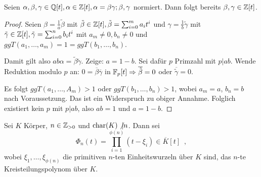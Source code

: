 \documentclass[12pt,a4paper]{scrartcl}
\begin{document}
\begin{lem}\label{lem:24.5}
	Seien $\alpha, \beta, \gamma\in\mathbb Q[t], \alpha\in\mathbb Z[t], \alpha = \beta\gamma; \beta,\gamma$ normiert. Dann folgt bereits $\beta, \gamma\in\mathbb Z[t]$.
\end{lem}
\begin{proof}
	Seien
	$\beta = \frac1a\tilde{\beta}$ mit $\tilde{\beta}\in\mathbb Z[t], \tilde{\beta} = \sum_{i = 0}^ma_it^i$ und
	$\gamma = \frac1b\tilde{\gamma}$ mit $\tilde{\gamma}\in\mathbb Z[t], \tilde{\gamma} = \sum_{i = 0}^nb_it^i$ mit $a_m \neq 0, b_n\neq 0$ und $ggT(a_1,\dots, a_m) = 1 = ggT(b_1,\dots, b_n)$.
	
	Damit gilt also $ab\alpha = \tilde{\beta}\tilde{\gamma}$. Zeige: $a = 1-b$. Sei dafür $p$ Primzahl mit $p|ab$. Wende Reduktion modulo $p$ an: $0 = \overline{\beta}\overline{\gamma}$ in $\mathbb F_p[t]\Rightarrow \overline{\tilde{\beta}} = 0$ oder $\overline{\tilde{\gamma}} = 0$.
	
	Es folgt $ggT(a_1,\dots,A_m)>1$ oder $ggT(b_1,\dots, b_n)>1$, wobei $a_m = a$, $b_n = b$ nach Voraussetzung. Das ist ein Widerspruch zu obiger Annahme. Folglich existiert kein $p$ mit $p|ab$, also $ab = 1$ und $a = 1-b$.
\end{proof}

\begin{defi}
	Sei $K$ Körper, $n\in\mathbb Z_{>0}$ und $\operatorname{char}(K)\not| n$. Dann sei
	$$\Phi_n(t) = \prod_{i = 1}^{\phi(n)}(t-\xi_i)\in\overline{K}[t]\enspace,$$
	wobei $\xi_1,\dots,\xi_{\phi(n)}$ die primitiven $n$-ten Einheitswurzeln über $K$ sind, das $n$-te Kreisteilungspolynom über $K$.
\end{defi}
\end{document}
